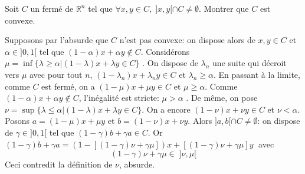 \documentclass{fancybook}
\begin{document}
\begin{exercice}
Soit $C$ un fermé de $\mathbb R^n$ tel que $\forall x,y \in C,\; ]x,y[\cap C \neq \emptyset$.\newline
Montrer que $C$ est convexe.
\end{exercice}
Supposons par l'absurde que $C$ n'est pas convexe: on dispose alors de $x,y\in C$ et $\alpha\in ]0,1[$ tel que $(1-\alpha)x+\alpha y\notin C$.\newline\newline 
Considérons $\mu=\inf\{\lambda\geq \alpha| (1-\lambda)x+\lambda y\in C\} $ . On dispose de $\lambda_n$ une suite qui décroit vers $\mu$ avec pour tout $n$, $(1-\lambda_n)x+\lambda_n y\in C$ et $\lambda_n\geq \alpha$. En passant à la limite, comme $C$ est fermé, on a $(1-\mu)x+\mu y\in C$ et $\mu\geq \alpha$. Comme $(1-\alpha)x+\alpha y\notin C$, l'inégalité est stricte: $\mu>\alpha$ .\newline \newline
De même, on pose $\nu=\sup\{\lambda\leq \alpha| (1-\lambda)x+\lambda y\in C\} $. On a encore $(1-\nu)x+\nu y\in C$ et $\nu< \alpha$.\newline \newline
Posons $a=(1-\mu)x+\mu y$ et $b=(1-\nu)x+\nu y$. Alors $]a,b[\cap C\neq \emptyset$: on dispose de $\gamma\in ]0,1[$ tel que $(1-\gamma)b+\gamma a\in C$. \newline \newline
Or $(1-\gamma)b+\gamma a = (1-[(1-\gamma)\nu + \gamma \mu])x + [(1-\gamma)\nu + \gamma \mu]y\;$ avec $$(1-\gamma)\nu + \gamma \mu\in \; ]\nu,\mu[ 
$$
Ceci contredit la définition de $\nu$, absurde.
\end{document}
